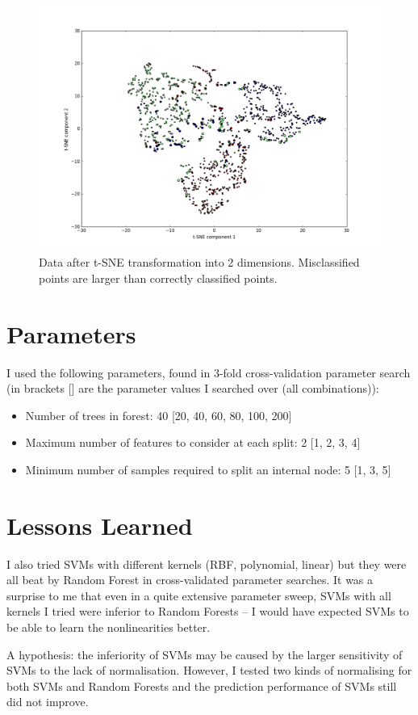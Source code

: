 \documentclass[a4paper, 11pt]{article}
\begin{document}
\begin{figure}[h]
	\begin{center}
	\includegraphics[width=\textwidth]{failures1}
	\end{center}
	\caption{Data after t-SNE transformation into 2 dimensions. Misclassified points are larger than correctly classified points.}
	\label{fig:tsne}
\end{figure}

\section{Parameters}
I used the following parameters, found in 3-fold cross-validation parameter search (in brackets [] are the parameter values I searched over (all combinations)):

\begin{itemize}
	\item Number of trees in forest: 40 [20, 40, 60, 80, 100, 200]
	\item Maximum number of features to consider at each split: 2 [1, 2, 3, 4]
	\item Minimum number of samples required to split an internal node: 5 [1, 3, 5]
\end{itemize}

\section{Lessons Learned}

I also tried SVMs with different kernels (RBF, polynomial, linear) but they were all beat by Random Forest in cross-validated parameter searches. It was a surprise to me that even in a quite extensive parameter sweep, SVMs with all kernels I tried were inferior to Random Forests -- I would have expected SVMs to be able to learn the nonlinearities better.

A hypothesis: the inferiority of SVMs may be caused by the larger sensitivity of SVMs to the lack of normalisation. However, I tested two kinds of normalising for both SVMs and Random Forests and the prediction performance of SVMs still did not improve.
\end{document}
